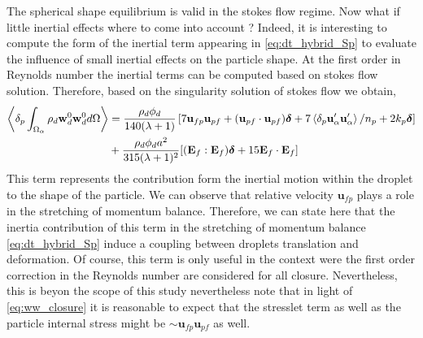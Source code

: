 The spherical shape equilibrium is valid in the stokes flow regime. 
Now what if little inertial effects where to come into account  ?
Indeed, it is interesting to compute the form of the inertial term appearing in \ref{eq:dt_hybrid_Sp} to evaluate the influence of small inertial effects on the particle shape. 
At the first order in Reynolds number the inertial terms can be computed based on stokes flow solution. 
Therefore, based on the singularity solution of stokes flow we obtain, 
\begin{align*}
    \pOavg{\rho_d \textbf{w}_d^0  \textbf{w}_d^0 }
    &= \frac{\rho_d \phi_d}{140(\lambda +1 )}
    \left[
        7\textbf{u}_{fp}\textbf{u}_{pf} 
    + (\textbf{u}_{pf}\cdot \textbf{u}_{pf})\bm\delta
    + 7\pavg{\textbf{u}_\alpha'\textbf{u}_\alpha'}/n_p 
    + 2k_p \bm\delta
    \right]\\
    &+ \frac{\rho_d \phi_d a^2}{315 (\lambda + 1)^2}[(\textbf{E}_f : \textbf{E}_f)\bm\delta+15\textbf{E}_f\cdot \textbf{E}_f]
    \label{eq:ww_closure}
\end{align*}
This term represents the contribution form the inertial motion within the droplet to the shape of the particle. 
We can observe that relative velocity $\textbf{u}_{fp}$ plays a role in the stretching of momentum balance. 
Therefore, we can state here that the inertia contribution of this term in the stretching of momentum balance \ref{eq:dt_hybrid_Sp} induce a coupling between droplets translation and deformation. 
Of course, this term is only useful in the context were the first order correction in the Reynolds number are considered for all closure. 
Nevertheless, this is beyon the scope of this study nevertheless note that in light of \ref{eq:ww_closure} it is reasonable to expect that the stresslet term as well as the particle internal stress might be $\sim \textbf{u}_{fp}\textbf{u}_{pf} $ as well. 

